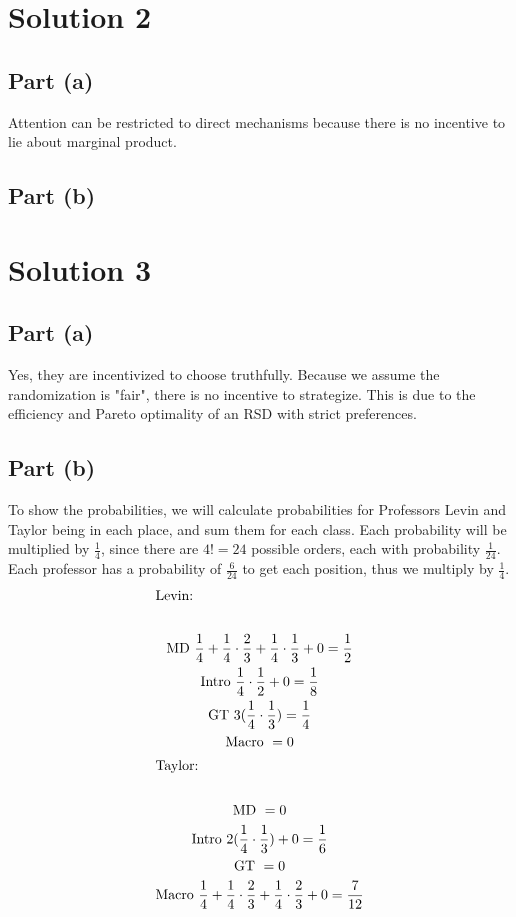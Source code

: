 \documentclass[10pt,a4paper]{article}
\begin{document}
\section*{Solution 2}
  \subsection*{Part (a)}
    Attention can be restricted to direct mechanisms because there is no incentive to lie about marginal product. 

  \subsection*{Part (b)}
    
\section*{Solution 3}
  \subsection*{Part (a)}
    Yes, they are incentivized to choose truthfully. Because we assume the randomization is "fair", there is no incentive to strategize. This is due to the efficiency and Pareto optimality of an RSD with strict preferences.
  \subsection*{Part (b)}
    To show the probabilities, we will calculate probabilities for Professors Levin and Taylor being in each place, and sum them for each class. Each probability will be multiplied by $\frac{1}{4}$, since there are $4! = 24$ possible orders, each with probability $\frac{1}{24}$. Each professor has a probability of $\frac{6}{24}$ to get each position, thus we multiply by $\frac{1}{4}$. 
    \begin{gather*}
      \shortintertext{Levin:} \\
      \text{MD} \ \frac{1}{4} + \frac{1}{4}\cdot\frac{2}{3} + \frac{1}{4}\cdot\frac{1}{3} + 0 = \frac{1}{2} \\
      \text{Intro} \ \frac{1}{4}\cdot\frac{1}{2} + 0 = \frac{1}{8} \\
      \text{GT} \ 3(\frac{1}{4}\cdot\frac{1}{3}) = \frac{1}{4} \\
      \text{Macro} \ = 0 \\
      \shortintertext{Taylor:} \\
      \text{MD} \ = 0 \\
      \text{Intro} \ 2(\frac{1}{4}\cdot\frac{1}{3}) + 0 = \frac{1}{6} \\
      \text{GT} \  = 0 \\
      \text{Macro} \ \frac{1}{4} + \frac{1}{4}\cdot\frac{2}{3} + \frac{1}{4}\cdot\frac{2}{3} + 0 = \frac{7}{12} \\
    \end{gather*}
\end{document}
